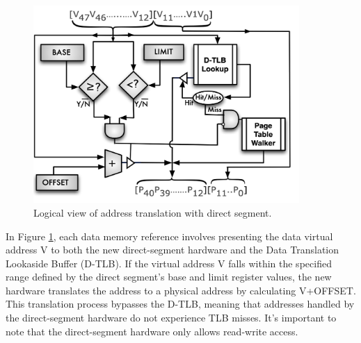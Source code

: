 \begin{figure}[h]
  \includegraphics[width=0.9\textwidth]{segment.png}
  \caption{Logical view of address translation with direct segment\cite{basu_efficient_nodate}.}
  \label{fig:Segment}
\end{figure}

In Figure \ref{fig:Segment}, each data memory reference involves presenting the data virtual address 
V to both the new direct-segment hardware and the Data Translation Lookaside Buffer (D-TLB). If the virtual address 
V falls within the specified range defined by the direct segment's base and limit register values, the new hardware translates the address to a physical address by calculating 
V+OFFSET. This translation process bypasses the D-TLB, meaning that addresses handled by the direct-segment hardware do not experience TLB misses. 
It's important to note that the direct-segment hardware only allows read-write access.

